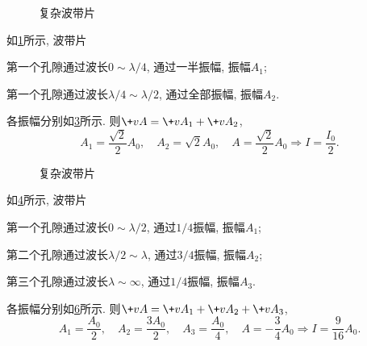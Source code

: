 \documentclass{ctexart}
\begin{document}
\begin{figure}[ht]
    \centering
    \begin{subfigure}[b]{5.5cm}
        \centering
        \caption{}
        \label{fig:复杂波带片2}
    \end{subfigure}
    \let\saveinfty\infty%
    \def\infty{\max}%
    \begin{subfigure}[b]{6.5cm}
        \centering
        \caption{}
        \label{fig:复杂波带片2向量图}
    \end{subfigure}
    \let\infty\saveinfty%
    \caption{复杂波带片}
\end{figure}
\begin{sample}
    \begin{ex}
        如\cref{fig:复杂波带片2}所示, 波带片
        \begin{cenum}
            \item 第一个孔隙通过波长$0\sim \lambda/4$, 通过一半振幅, 振幅$A_1$;
            \item 第一个孔隙通过波长$\lambda/4 \sim \lambda/2$, 通过全部振幅, 振幅$A_2$.
        \end{cenum}
        各振幅分别如\cref{fig:复杂波带片2向量图}所示. 则$\+vA = \+vA_1 + \+vA_2$,
        \[ A_1 = \frac{\sqrt{2}}{2}A_0, \quad A_2 = \sqrt{2}A_0,\quad A = \frac{\sqrt{2}}{2}A_0 \Rightarrow I = \frac{I_0}{2}. \]
    \end{ex}
\end{sample}
\begin{figure}[ht]
    \centering
    \begin{subfigure}[b]{5.5cm}
        \centering
        \caption{}
        \label{fig:复杂波带片3}
    \end{subfigure}
    \let\saveinfty\infty%
    \def\infty{\max}%
    \begin{subfigure}[b]{6.5cm}
        \centering
        \caption{}
        \label{fig:复杂波带片3向量图}
    \end{subfigure}
    \let\infty\saveinfty%
    \caption{复杂波带片}
\end{figure}
\begin{sample}
    \begin{ex}
        如\cref{fig:复杂波带片3}所示, 波带片
        \begin{cenum}
            \item 第一个孔隙通过波长$0\sim \lambda/2$, 通过$1/4$振幅, 振幅$A_1$;
            \item 第二个孔隙通过波长$\lambda/2\sim \lambda$, 通过$3/4$振幅, 振幅$A_2$;
            \item 第三个孔隙通过波长$\lambda\sim \infty$, 通过$1/4$振幅, 振幅$A_3$.
        \end{cenum}
        各振幅分别如\cref{fig:复杂波带片3向量图}所示. 则$\+vA = \+vA_1 + \+vA_2 + \+vA_3$,
        \[ A_1 = \frac{A_0}{2}, \quad A_2 = \frac{3A_0}{2}, \quad A_3 = \frac{A_0}{4}, \quad A = -\frac{3}{4}A_0 \Rightarrow I = \frac{9}{16}A_0. \]
    \end{ex}
\end{sample}
\end{document}
